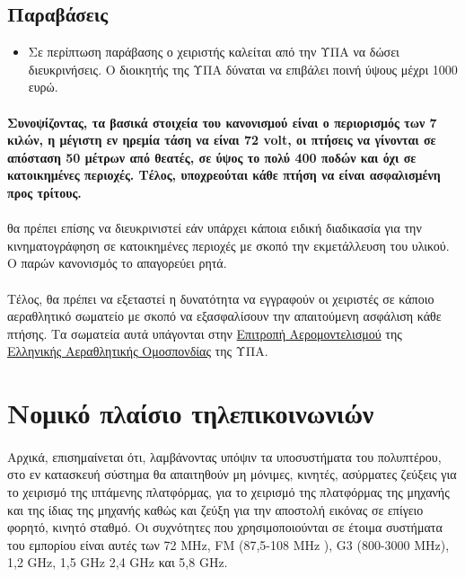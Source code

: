 \documentclass[a4paper, 12pt, twoside]{report}
\begin{document}
{{{{{{		\subsection{Παραβάσεις}
			\begin{itemize}
				\item Σε περίπτωση παράβασης ο χειριστής καλείται από την ΥΠΑ να δώσει διευκρινήσεις. Ο διοικητής της ΥΠΑ δύναται να επιβάλει ποινή ύψους μέχρι 1000 ευρώ.
			\end{itemize}
			
			\paragraph{}{\textbf{Συνοψίζοντας, τα βασικά στοιχεία του κανονισμού είναι ο περιορισμός των 7 κιλών, η μέγιστη εν ηρεμία τάση να είναι 72 volt, οι πτήσεις να γίνονται σε απόσταση 50 μέτρων από θεατές, σε ύψος το πολύ 400 ποδών και όχι σε κατοικημένες περιοχές. Τέλος, υποχρεούται κάθε πτήση να είναι ασφαλισμένη προς τρίτους.}
			}
			\paragraph{}{θα πρέπει επίσης να διευκρινιστεί εάν υπάρχει κάποια ειδική διαδικασία για την κινηματογράφηση σε κατοικημένες περιοχές με σκοπό την εκμετάλλευση του υλικού. Ο παρών κανονισμός το απαγορεύει ρητά.
			}
			\paragraph{}{Τέλος, θα πρέπει να εξεταστεί η δυνατότητα να εγγραφούν οι χειριστές σε κάποιο αεραθλητικό σωματείο με σκοπό να εξασφαλίσουν την απαιτούμενη ασφάλιση κάθε πτήσης. Τα σωματεία αυτά υπάγονται στην \href{http://epae.elao.gr/}{Επιτροπή Αερομοντελισμού} της \href{http://www.elao.gr/web/index.html}{Ελληνικής Αεραθλητικής Ομοσπονδίας} της ΥΠΑ.
			}			
			
			
		\section{Νομικό πλαίσιο τηλεπικοινωνιών}		
			
			\paragraph{}{Αρχικά, επισημαίνεται ότι, λαμβάνοντας υπόψιν τα υποσυστήματα του πολυπτέρου, στο εν κατασκευή σύστημα θα απαιτηθούν μη μόνιμες, κινητές, ασύρματες ζεύξεις για το χειρισμό της ιπτάμενης πλατφόρμας, για το χειρισμό της πλατφόρμας της μηχανής και της ίδιας της μηχανής καθώς και ζεύξη για την αποστολή εικόνας σε επίγειο φορητό, κινητό σταθμό. Οι συχνότητες που χρησιμοποιούνται σε έτοιμα συστήματα του εμπορίου είναι αυτές των 72 MHz, FM (87,5-108 MHz ), G3 (800-3000 MHz), 1,2 GHz, 1,5 GHz 2,4 GHz και 5,8 GHz.
			}
			
}}}}}}
\end{document}
